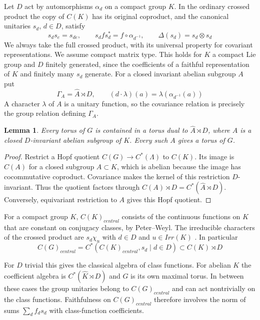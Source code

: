 \documentclass[11pt,a4paper]{article}
\newtheorem{lem}[thm]{Lemma}
\theoremstyle{remark}
\begin{document}
Let $D$ act by automorphisms $\alpha_d$ on a compact group $K$. In the
ordinary crossed product the copy of $C(K)$ has its original coproduct,
and the canonical unitaries $s_d$, $d\in D$, satisfy
\[
 s_ds_e=s_{de},\qquad s_df s_d^*=f\circ\alpha_{d^{-1}},\qquad
 \Delta(s_d)=s_d\otimes s_d
\]
We always take the full crossed product, with its universal property for
covariant representations. We assume compact matrix type. This holds for
$K$ a compact Lie group and $D$ finitely generated, since the coefficients
of a faithful representation of $K$ and finitely many $s_d$ generate.
For a closed invariant abelian subgroup $A$ put
\[
 \Gamma_A=\widehat A\rtimes D,\qquad
 (d\cdot\lambda)(a)=\lambda(\alpha_{d^{-1}}(a))
\]
A character $\lambda$ of $A$ is a unitary function, so the covariance
relation is precisely the group relation defining $\Gamma_A$.

\begin{lem}\label{abelian}
Every torus of $G$ is contained in a torus dual to $\widehat A\rtimes D$,
where $A$ is a closed $D$-invariant abelian subgroup of $K$. Every
such $A$ gives a torus of $G$.
\end{lem}
\begin{proof}
Restrict a Hopf quotient $C(G)\to C^*(\Lambda)$ to $C(K)$.
Its image is $C(A)$ for a closed subgroup $A\subset K$, which is abelian
because the image has cocommutative coproduct. Covariance makes the
kernel of this restriction $D$-invariant. Thus the quotient factors
through $C(A)\rtimes D=C^*(\widehat A\rtimes D)$. Conversely,
equivariant restriction to $A$ gives this Hopf quotient.
\end{proof}

For a compact group $K$, $C(K)_{central}$ consists of the continuous
functions on $K$ that are constant on conjugacy classes, by Peter--Weyl. The irreducible characters of the crossed product are $s_d\chi_u$
with $d\in D$ and $u\in Irr(K)$ \cite[Theorem~6.1]{fmp}. In particular
\[
 C(G)_{central}=C^*(C(K)_{central},s_d\mid d\in D)\subset C(K)\rtimes D
\]

For $D$ trivial this gives the classical algebra of class functions. For
abelian $K$ the coefficient algebra is $C^*(\widehat K\rtimes D)$ and
$G$ is its own maximal torus. In between these cases the group unitaries
belong to $C(G)_{central}$ and can act nontrivially on the class functions. Faithfulness on $C(G)_{central}$ therefore involves the norm of sums
$\sum_d f_ds_d$ with class-function coefficients.
\end{document}
